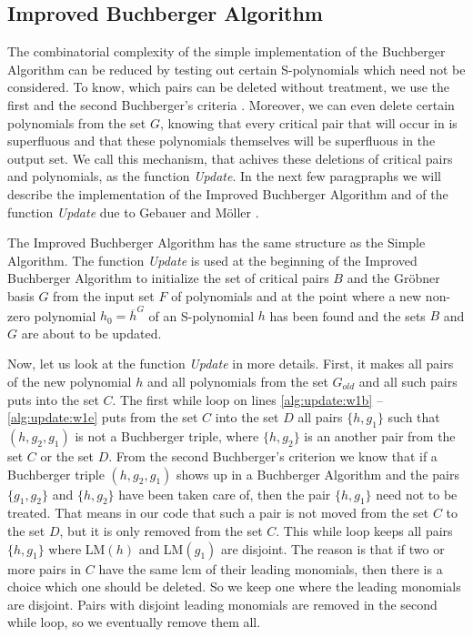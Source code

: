 \subsection{Improved Buchberger Algorithm}
\label{subsec:ImprovedBuchberger}
The combinatorial complexity of the simple implementation of the Buchberger Algorithm can be reduced by testing out certain S-polynomials which need not be considered. To know, which pairs can be deleted without treatment, we use the first and the second Buchberger's criteria \cite{Becker93}. Moreover, we can even delete certain polynomials from the set $G$, knowing that every critical pair that will occur in is superfluous and that these polynomials themselves will be superfluous in the output set. We call this mechanism, that achives these deletions of critical pairs and polynomials, as the function \textit{Update}.  In the next few paragpraphs we will describe the implementation of the Improved Buchberger Algorithm and of the function \textit{Update} due to Gebauer and M\"oller \cite{Gebauer-Moller88}.

The Improved Buchberger Algorithm has the same structure as the Simple Algorithm. The function \textit{Update} is used at the beginning of the Improved Buchberger Algorithm to initialize the set of critical pairs $B$ and the Gr\"obner basis $G$ from the input set $F$ of polynomials and at the point where a new non-zero polynomial $h_0 = \overline{h}^G$ of an S-polynomial $h$ has been found and the sets $B$ and $G$ are about to be updated.



Now, let us look at the function \textit{Update} in more details. First, it makes all pairs of the new polynomial $h$ and all polynomials from the set $G_{old}$ and all such pairs puts into the set $C$. The first while loop on lines \ref{alg:update:w1b} -- \ref{alg:update:w1e} puts from the set $C$ into the set $D$ all pairs $\{h, g_1\}$ such that $(h, g_2, g_1)$ is not a Buchberger triple, where $\{h, g_2\}$ is an another pair from the set $C$ or the set $D$. From the second Buchberger's criterion we know that if a Buchberger triple $(h, g_2, g_1)$ shows up in a Buchberger Algorithm and the pairs $\{g_1, g_2\}$ and $\{h, g_2\}$ have been taken care of, then the pair $\{h, g_1\}$ need not to be treated. That means in our code that such a pair is not moved from the set $C$ to the set $D$, but it is only removed from the set $C$. This while loop keeps all pairs $\{h, g_1\}$ where LM$(h)$ and LM$(g_1)$ are disjoint. The reason is that if two or more pairs in $C$ have the same lcm of their leading monomials, then there is a choice which one should be deleted. So we keep one where the leading monomials are disjoint. Pairs with disjoint leading monomials are removed in the second while loop, so we eventually remove them all.

